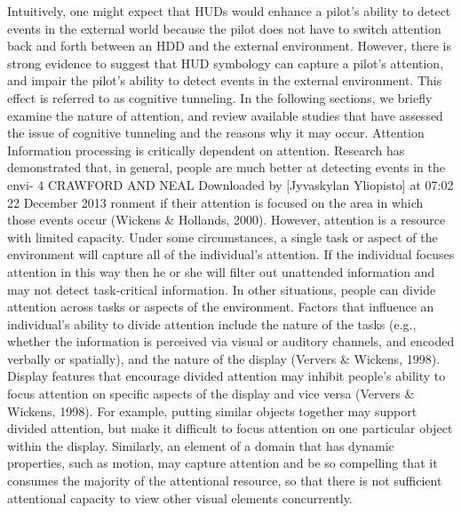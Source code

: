 \documentclass[utf8,bachelor,manualbib]{gradu3}
\begin{document}
Intuitively, one might expect that HUDs would enhance a pilot’s ability to detect
events in the external world because the pilot does not have to switch attention
back and forth between an HDD and the external environment. However, there
is strong evidence to suggest that HUD symbology can capture a pilot’s attention,
and impair the pilot’s ability to detect events in the external environment.
This effect is referred to as cognitive tunneling. In the following sections, we
briefly examine the nature of attention, and review available studies that have
assessed the issue of cognitive tunneling and the reasons why it may occur.
Attention
Information processing is critically dependent on attention. Research has demonstrated
that, in general, people are much better at detecting events in the envi-
4 CRAWFORD AND NEAL
Downloaded by [Jyvaskylan Yliopisto] at 07:02 22 December 2013
ronment if their attention is focused on the area in which those events occur
(Wickens \& Hollands, 2000). However, attention is a resource with limited capacity.
Under some circumstances, a single task or aspect of the environment
will capture all of the individual’s attention. If the individual focuses attention in
this way then he or she will filter out unattended information and may not detect
task-critical information. In other situations, people can divide attention across
tasks or aspects of the environment. Factors that influence an individual’s ability
to divide attention include the nature of the tasks (e.g., whether the information
is perceived via visual or auditory channels, and encoded verbally or spatially),
and the nature of the display (Ververs \& Wickens, 1998).
Display features that encourage divided attention may inhibit people’s ability to
focus attention on specific aspects of the display and vice versa (Ververs \&
Wickens, 1998). For example, putting similar objects together may support divided
attention, but make it difficult to focus attention on one particular object
within the display. Similarly, an element of a domain that has dynamic properties,
such as motion, may capture attention and be so compelling that it consumes the
majority of the attentional resource, so that there is not sufficient attentional capacity
to view other visual elements concurrently. \citep{crawford2006}
\end{document}
